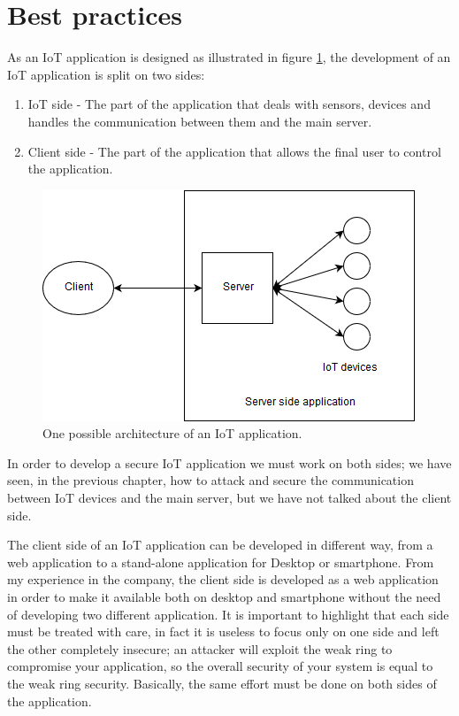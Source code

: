\section{Best practices}
As an IoT application is designed as illustrated in figure \ref{fig:best0}, the development of an IoT application is split on two sides:
\begin{enumerate}
	\item IoT side - The part of the application that deals with sensors, devices and handles the communication between them and the main server.
	\item Client side - The part of the application that allows the final user to control the application.
\end{enumerate}


	\begin{figure}
	\includegraphics[width=\linewidth]{bestpractice-img0.png}
	\caption{One possible architecture of an IoT application.}
	\label{fig:best0}
\end{figure}

In order to develop a secure IoT application we must work on both sides; we have seen, in the previous chapter, how to attack and secure the communication between IoT devices and the main server, but we have not talked about the client side.\newline

The client side of an IoT application can be developed in different way, from a web application to a stand-alone application for Desktop or smartphone.\newline
From my experience in the company, the client side is developed as a web application in order to make it available both on desktop and smartphone without the need of developing two different application.\newline
It is important to highlight that each side must be treated with care, in fact it is useless to focus only on one side and left the other completely insecure; an attacker will exploit the weak ring to compromise your application, so the overall security of your system is equal to the weak ring security.\newline
Basically, the same effort must be done on both sides of the application.\newline

